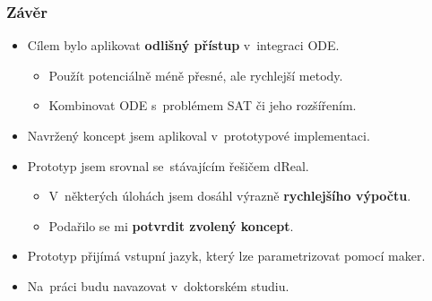 \documentclass[t]{beamer}
\newcommand{\picFn}[1]{../img/#1}
\newcommand{\picL}{pic}
\newcommand{\pic}[3]{
\begin{figure}
\centering
\texttt{[image: \\picFn\{\#1]}}
\label{\picL:#2}
\end{figure}
}
\begin{document}



\begin{frame}\frametitle{Závěr}
\begin{itemize}
\item Cílem bylo aplikovat \textbf{odlišný přístup} v~integraci ODE.
   \begin{itemize}
   \item Použít potenciálně méně přesné, ale rychlejší metody.
   \item Kombinovat ODE s~problémem SAT či jeho rozšířením.
   \end{itemize}
\item Navržený koncept jsem aplikoval v~prototypové implementaci.
\item Prototyp jsem srovnal se~stávajícím řešičem dReal.
   \begin{itemize}
   \item V~některých úlohách jsem dosáhl výrazně \textbf{rychlejšího výpočtu}.
   \item Podařilo se mi \textbf{potvrdit zvolený koncept}.
   \end{itemize}
\item Prototyp přijímá vstupní jazyk, který lze parametrizovat pomocí maker.
\item Na~práci budu navazovat v~doktorském studiu.
\end{itemize}
\end{frame}





\end{document}
